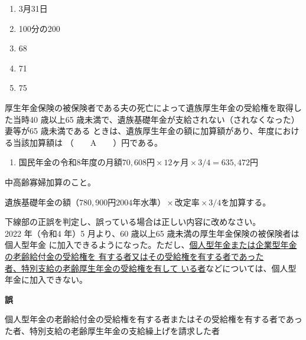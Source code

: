 \begin{answerbox}
  \begin{enumerate}[A: ]
    \item 3月31日
    \item 100分の200
    \item 68
    \item 71
    \item 75
  \end{enumerate}
\end{answerbox}


\begin{fillblank}[年金1 2020 問題1(5)\textcircled{4}]
厚生年金保険の被保険者である夫の死亡によって遺族厚生年金の受給権を取得した当時40
歳以上65 歳未満で、遺族基礎年金が支給されない（されなくなった）妻等が65 歳未満である
ときは、遺族厚生年金の額に加算額があり、\warekiyear 年度における当該加算額は
（　　A　　）円である。
\end{fillblank}

\begin{answerbox}
  \begin{enumerate}[A: ]
    \item 国民年金の令和8年度の月額$70,608円 \times 12ヶ月 \times 3/4 = 635,472円$
  \end{enumerate}
\end{answerbox}

\begin{explanationbox}
  中高齢寡婦加算のこと。

  $遺族基礎年金の額（780,900円　2004年水準） \times 改定率 \times 3/4$を加算する。
\end{explanationbox}

\begin{truefalse}[年金1 2022 問題1(4)エ]
下線部の正誤を判定し、誤っている場合は正しい内容に改めなさい。
\\

  2022 年（令和4 年）5 月より、60 歳以上65 歳未満の厚生年金保険の被保険者は個人型年金
に加入できるようになった。ただし、\underline{個人型年金または企業型年金の老齢給付金の受給権を
有する者又はその受給権を有する者であった}\\
\underline{者、特別支給の老齢厚生年金の受給権を有して
いる者}などについては、個人型年金に加入できない。
\end{truefalse}

\begin{answerbox}
\textbf{誤}


  個人型年金の老齢給付金の受給権を有する者またはその受給権を有する者であった者、特別支給の老齢厚生年金の支給繰上げを請求した者
\end{answerbox}

